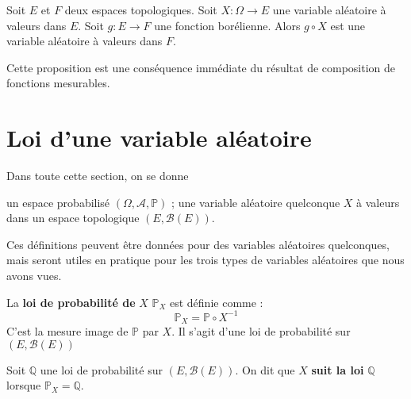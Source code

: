 \documentclass[../integ-proba.tex]{subfiles}
\begin{document}
    \begin{prop}
        \label{prop:composition_var_bor}
        Soit $E$ et $F$ deux espaces topologiques.
        Soit $X:\Omega \longrightarrow E$ une variable aléatoire à valeurs dans $E$.
        Soit $g:E \longrightarrow F$ une fonction borélienne.
        Alors $g \circ X$ est une variable aléatoire à valeurs dans $F$.
    \end{prop}

    \begin{rem}
        Cette proposition est une conséquence immédiate du résultat de composition de fonctions mesurables.
    \end{rem}

    \section{Loi d'une variable aléatoire}

    Dans toute cette section, on se donne
    \begin{itemize}
        \itemb un espace probabilisé $\left(\Omega, \mathcal{A}, \mathbb{P}\right)$ ;
        \itemb une variable aléatoire quelconque $X$ à valeurs dans un espace topologique $\left(E, \mathcal{B}(E)\right)$.
    \end{itemize}

    Ces définitions peuvent être données pour des variables aléatoires quelconques, mais seront utiles en pratique pour les trois types de variables aléatoires que nous avons vues.

    \begin{defi}
        La \textbf{loi de probabilité de} $X$ $\mathbb{P}_X$ est définie comme :
        \begin{displaymath}
            \mathbb{P}_X=\mathbb{P} \circ X^{-1}
        \end{displaymath}
        C'est la mesure image de $\mathbb{P}$ par $X$.
        Il s'agit d'une loi de probabilité sur $\left(E, \mathcal{B}(E) \right)$
    \end{defi}

    \begin{defi}
        Soit $\mathbb{Q}$ une loi de probabilité sur $\left(E, \mathcal{B}(E) \right)$.
        On dit que $X$ \textbf{suit la loi} $\mathbb{Q}$ lorsque $\mathbb{P}_X = \mathbb{Q}$.
    \end{defi}
\end{document}

